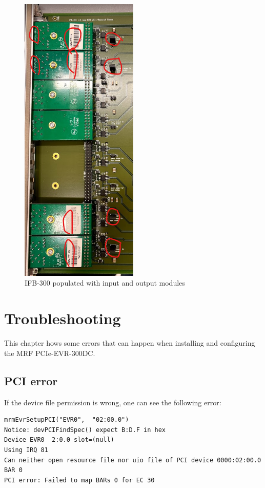 \documentclass[11pt
  , a4paper
  , article
  , oneside
  , showtrims
]{memoir}
\begin{document}
{\begin{figure}[!htb]
  \centering
    \includegraphics[width=0.5\textwidth]{./pictures/ifb300_test_config.png}
  \caption{IFB-300 populated with input and output modules}
  \label{fig:inputjumpers}
\end{figure}



\chapter{Troubleshooting}
This chapter hows some errors that can happen when installing and configuring the MRF PCIe-EVR-300DC.\\


\section{PCI error}
If the device file permission is wrong, one can see the following error:
\begin{lstlisting}
mrmEvrSetupPCI("EVR0",  "02:00.0")
Notice: devPCIFindSpec() expect B:D.F in hex
Device EVR0  2:0.0 slot=(null)
Using IRQ 81
Can neither open resource file nor uio file of PCI device 0000:02:00.0 BAR 0
PCI error: Failed to map BARs 0 for EC 30
\end{lstlisting}


}
\end{document}
